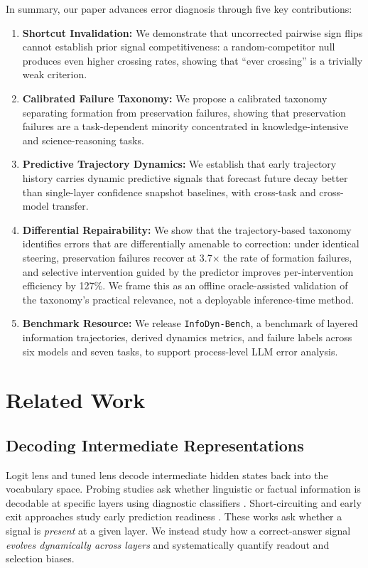 \documentclass{article} %
\begin{document}
In summary, our paper advances error diagnosis through five key contributions:
\begin{enumerate}
    \item \textbf{Shortcut Invalidation:} We demonstrate that uncorrected pairwise sign flips cannot establish prior signal competitiveness: a random-competitor null produces even higher crossing rates, showing that ``ever crossing'' is a trivially weak criterion.
    \item \textbf{Calibrated Failure Taxonomy:} We propose a calibrated taxonomy separating formation from preservation failures, showing that preservation failures are a task-dependent minority concentrated in knowledge-intensive and science-reasoning tasks.
    \item \textbf{Predictive Trajectory Dynamics:} We establish that early trajectory history carries dynamic predictive signals that forecast future decay better than single-layer confidence snapshot baselines, with cross-task and cross-model transfer.
    \item \textbf{Differential Repairability:} We show that the trajectory-based taxonomy identifies errors that are differentially amenable to correction: under identical steering, preservation failures recover at 3.7$\times$ the rate of formation failures, and selective intervention guided by the predictor improves per-intervention efficiency by 127\%. We frame this as an offline oracle-assisted validation of the taxonomy's practical relevance, not a deployable inference-time method.
    \item \textbf{Benchmark Resource:} We release \texttt{InfoDyn-Bench}, a benchmark of layered information trajectories, derived dynamics metrics, and failure labels across six models and seven tasks, to support process-level LLM error analysis.
\end{enumerate}

\section{Related Work}

\subsection{Decoding Intermediate Representations}
Logit lens \citep{nostalgebraist2020logitlens} and tuned lens \citep{belrose2023tunedlens} decode intermediate hidden states back into the vocabulary space. Probing studies ask whether linguistic or factual information is decodable at specific layers using diagnostic classifiers \citep{alain2016understanding, tenney2019bert, hewitt2019structural, belinkov2022probing}. Short-circuiting and early exit approaches study early prediction readiness \citep{schuster2022confident, din2023jump}. These works ask whether a signal is \emph{present} at a given layer. We instead study how a correct-answer signal \emph{evolves dynamically across layers} and systematically quantify readout and selection biases.
\end{document}
